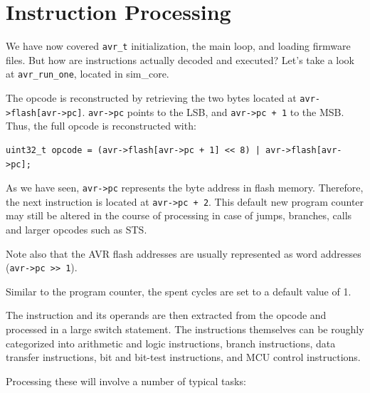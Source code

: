 \section{Instruction Processing} \label{section:instruction_processing}

We have now covered \lstinline|avr_t| initialization, the main loop, and loading
firmware files. But how are instructions actually decoded and executed? Let's
take a look at \lstinline|avr_run_one|, located in sim\_core.

The opcode is reconstructed by retrieving the two bytes located at
\lstinline|avr->flash[avr->pc]|. \lstinline|avr->pc| points to the \ac{LSB}, and
\lstinline|avr->pc + 1| to the \ac{MSB}. Thus, the full opcode is reconstructed with:

\begin{lstlisting}
uint32_t opcode = (avr->flash[avr->pc + 1] << 8) | avr->flash[avr->pc];
\end{lstlisting}

As we have seen, \lstinline|avr->pc| represents the byte address in flash memory.
Therefore, the next instruction is located at \lstinline|avr->pc + 2|. This
default new program counter may still be altered in the course of processing
in case of jumps, branches, calls and larger opcodes such as STS\cite{instructionset}.

Note also that the \ac{AVR} flash addresses are usually represented as word addresses
(\lstinline|avr->pc >> 1|).

Similar to the program counter, the spent cycles are set to a default value of 1.

The instruction and its operands are then extracted from the opcode and processed
in a large switch statement. The instructions themselves can be roughly categorized
into arithmetic and logic instructions, branch instructions, data transfer
instructions, bit and bit-test instructions, and \ac{MCU} control instructions.

Processing these will involve a number of typical tasks:

